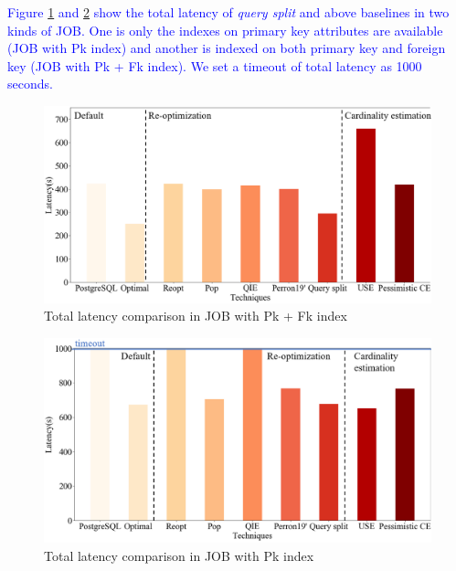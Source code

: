 \textcolor{blue}{
    Figure \ref{F10} and \ref{F11} show the total latency of \textit{query split} and above baselines in two kinds of JOB. One is only the indexes on primary key attributes are available (JOB with Pk index) and another is indexed on both primary key and foreign key (JOB with Pk + Fk index). We set a timeout of total latency as 1000 seconds.
}
    \begin{figure}[htb]
        \includegraphics[width=\linewidth]{./pic/Figure10.png}
        \centering
        \caption{Total latency comparison in JOB with Pk + Fk index}
        \label{F10}
        \Description{}
    \end{figure}
    \begin{figure}[htb]
        \includegraphics[width=\linewidth]{./pic/Figure11.png}
        \centering
        \caption{Total latency comparison in JOB with Pk index}
        \label{F11}
        \Description{}
    \end{figure}\par

